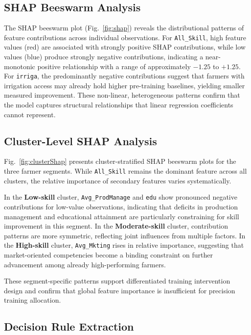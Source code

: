 \documentclass[3p,twocolumn,authoryear]{elsarticle}
\begin{document}
\subsection{SHAP Beeswarm Analysis}

The SHAP beeswarm plot (Fig.~\ref{fig:shap}) reveals the
distributional patterns of feature contributions across
individual observations.
For \texttt{All\_Skill}, high feature values (red) are
associated with strongly positive SHAP contributions,
while low values (blue) produce strongly negative
contributions, indicating a near-monotonic positive
relationship with a range of approximately $-1.25$ to
$+1.25$.
For \texttt{irriga}, the predominantly negative
contributions suggest that farmers with irrigation
access may already hold higher pre-training baselines,
yielding smaller measured improvement.
These non-linear, heterogeneous patterns confirm that
the model captures structural relationships that linear
regression coefficients cannot represent.

\subsection{Cluster-Level SHAP Analysis}

Fig.~\ref{fig:clusterShap} presents cluster-stratified
SHAP beeswarm plots for the three farmer segments.
While \texttt{All\_Skill} remains the dominant feature
across all clusters, the relative importance of secondary
features varies systematically.

In the \textbf{Low-skill} cluster, \texttt{Avg\_ProdManage}
and \texttt{edu} show pronounced negative contributions
for low-value observations, indicating that deficits
in production management and educational attainment are
particularly constraining for skill improvement in this
segment.
In the \textbf{Moderate-skill} cluster, contribution
patterns are more symmetric, reflecting joint influences
from multiple factors.
In the \textbf{High-skill} cluster, \texttt{Avg\_Mkting}
rises in relative importance, suggesting that
market-oriented competencies become a binding constraint
on further advancement among already high-performing farmers.

These segment-specific patterns support differentiated
training intervention design and confirm that global
feature importance is insufficient for precision training
allocation.

\subsection{Decision Rule Extraction}
\end{document}
